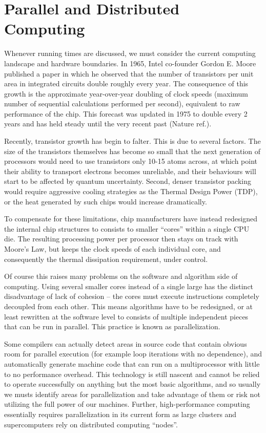 \section{Parallel and Distributed Computing}

	Whenever running times are discussed, we must consider the current computing landscape and hardware boundaries. In 1965, Intel co-founder Gordon E. Moore published a paper in which he observed that the number of transistors per unit area in integrated circuits double roughly every year. The consequence of this growth is the approximate year-over-year doubling of clock speeds (maximum number of sequential calculations performed per second), equivalent to raw performance of the chip. This forecast was updated in 1975 to double every 2 years and has held steady until the very recent past (Nature ref.).

	Recently, transistor growth has begin to falter. This is due to several factors. The size of the transistors themselves has become so small that the next generation of processors would need to use transistors only 10-15 atoms across, at which point their ability to transport electrons becomes unreliable, and their behaviours will start to be affected by quantum uncertainty. Second, denser transistor packing would require aggressive cooling strategies as the Thermal Design Power (TDP), or the heat generated by such chips would increase dramatically.

	To compensate for these limitations, chip manufacturers have instead redesigned the internal chip structures to consists to smaller ``cores'' within a single CPU die. The resulting processing power per processor then stays on track with Moore's Law, but keeps the clock speeds of each individual core, and consequently the thermal dissipation requirement, under control.

	Of course this raises many problems on the software and algorithm side of computing. Using several smaller cores instead of a single large has the distinct disadvantage of lack of cohesion -- the cores must execute instructions completely decoupled from each other. This means algorithms have to be redesigned, or at least rewritten at the software level to consists of multiple independent pieces that can be run in parallel. This practice is known as parallelization.

	Some compilers can actually detect areas in source code that contain obvious room for parallel execution (for example loop iterations with no dependence), and automatically generate machine code that can run on a multiprocessor with little to no performance overhead. This technology is still nascent and cannot be relied to operate successfully on anything but the most basic algorithms, and so usually we musts identify areas for parallelization and take advantage of them or risk not utilizing the full power of our machines. Further, high-performance computing essentially requires parallelization in its current form as large clusters and supercomputers rely on distributed computing ``nodes''.

